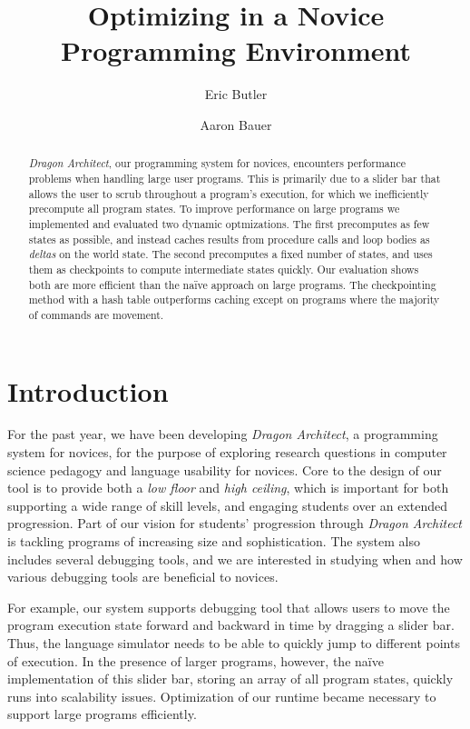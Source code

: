 \documentclass{sig-alternate}
\newcommand{\da}{\emph{Dragon Architect}}
\begin{document}
\title{Optimizing in a Novice Programming Environment}
\author{Eric Butler \and Aaron Bauer}
\maketitle{}

\begin{abstract}
    \da{}, our programming system for novices, encounters performance problems when handling large user programs. This is primarily due to a slider bar that allows the user to scrub throughout a program's execution, for which we inefficiently precompute all program states. To improve performance on large programs we implemented and evaluated two dynamic optmizations. The first precomputes as few states as possible, and instead caches results from procedure calls and loop bodies as \emph{deltas} on the world state. The second precomputes a fixed number of states, and uses them as checkpoints to compute intermediate states quickly. Our evaluation shows both are more efficient than the na\"{i}ve approach on large programs. The checkpointing method with a hash table outperforms caching except on programs where the majority of commands are movement.
\end{abstract}

\section{Introduction}

For the past year, we have been developing \da, a programming system for novices, for the purpose of exploring research questions in computer science pedagogy and language usability for novices. Core to the design of our tool is to provide both a \emph{low floor} and \emph{high ceiling}, which is important for both supporting a wide range of skill levels, and engaging students over an extended progression. Part of our vision for students' progression through \da{} is tackling programs of increasing size and sophistication. The system also includes several debugging tools, and we are interested in studying when and how various debugging tools are beneficial to novices. 

For example, our system supports debugging tool that allows users to move the program execution state forward and backward in time by dragging a slider bar. Thus, the language simulator needs to be able to quickly jump to different points of execution. In the presence of larger programs, however, the na\"{i}ve implementation of this slider bar, storing an array of all program states, quickly runs into scalability issues. Optimization of our runtime became necessary to support large programs efficiently. 
\end{document}
